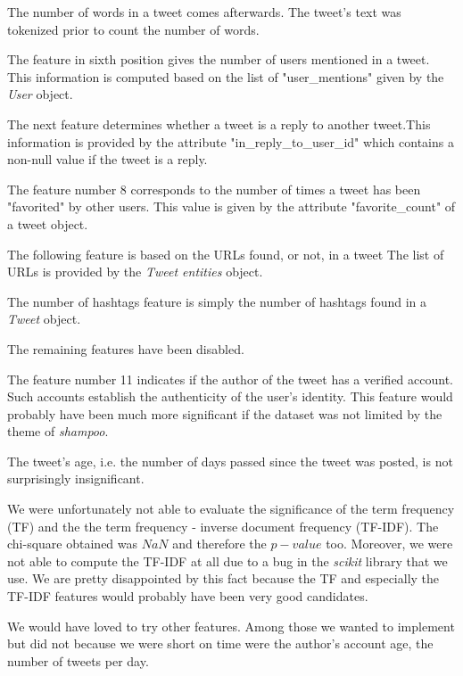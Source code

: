 The number of words in a tweet comes afterwards. The tweet's text was tokenized 
prior to count the number of words.

The feature in sixth position gives the number of users mentioned in a tweet.
This information is computed based on the list of "user\_mentions" given by the 
\emph{User} object.

The next feature determines whether a tweet is a reply to another tweet.This 
information is provided by the attribute "in\_reply\_to\_user\_id" 
which contains a non-null value if the tweet is a reply.

The feature number 8 corresponds to the number of times a tweet has been 
"favorited" by other users. This value is given by the attribute 
"favorite\_count" of a tweet object.

The following feature is based on the URLs found, or not, in a tweet 
The list of URLs is provided by the \emph{Tweet entities} object.

The number of hashtags feature is simply the number of hashtags found in a 
\emph{Tweet} object.

The remaining features have been disabled. 

The feature number 11 indicates if the author of the tweet has a verified 
account. Such accounts establish the authenticity of the user's identity. This 
feature would probably have been much more significant if the dataset was not 
limited by the theme of \textit{shampoo}.

The tweet's age, i.e. the number of days passed since the tweet was posted, is 
not surprisingly insignificant.

We were unfortunately not able to evaluate the significance of the term 
frequency (TF) and the the term frequency - inverse document frequency 
(TF-IDF). The chi-square obtained was $NaN$ and therefore the $p-value$ too.
Moreover, we were not able to compute the TF-IDF at all due to a bug in 
the \emph{scikit} library that we use. We are pretty disappointed by this fact 
because the TF and especially the TF-IDF features would probably have been very 
good candidates.

We would have loved to try other features. Among those we wanted to implement 
but did not because we were short on time were the author's account age, the 
number of tweets per day.

